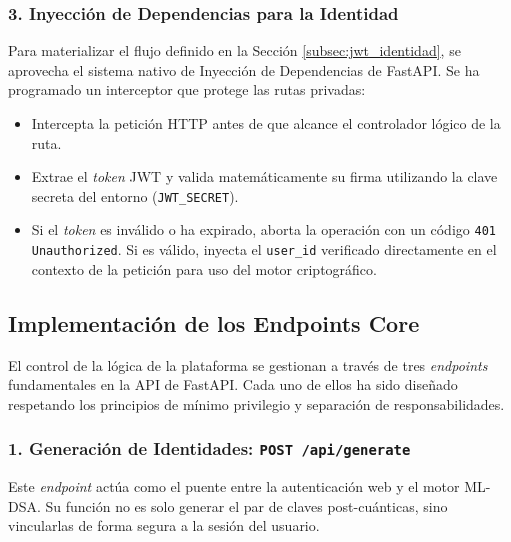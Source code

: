 \documentclass[11pt, a4paper]{report}
\theoremstyle{definition}
\begin{document}
\subsubsection*{3. Inyección de Dependencias para la Identidad}

Para materializar el flujo definido en la Sección \ref{subsec:jwt_identidad}, se aprovecha el sistema nativo de Inyección de Dependencias de FastAPI. Se ha programado un interceptor que protege las rutas privadas:
    
\begin{itemize}
    \item Intercepta la petición HTTP antes de que alcance el controlador lógico de la ruta.
    \item Extrae el \textit{token} JWT y valida matemáticamente su firma utilizando la clave secreta del entorno (\texttt{JWT\_SECRET}).
    \item Si el \textit{token} es inválido o ha expirado, aborta la operación con un código \texttt{401 Unauthorized}. Si es válido, inyecta el \texttt{user\_id} verificado directamente en el contexto de la petición para uso del motor criptográfico.
\end{itemize}


\subsection{Implementación de los Endpoints Core}
\label{subsec:endpoints_core}

El control de la lógica de la plataforma se gestionan a través de tres \textit{endpoints} fundamentales en la API de FastAPI. Cada uno de ellos ha sido diseñado respetando los principios de mínimo privilegio y separación de responsabilidades.

\subsubsection{1. Generación de Identidades: \texttt{POST /api/generate}}

Este \textit{endpoint} actúa como el puente entre la autenticación web y el motor ML-DSA. Su función no es solo generar el par de claves post-cuánticas, sino vincularlas de forma segura a la sesión del usuario.
\end{document}
